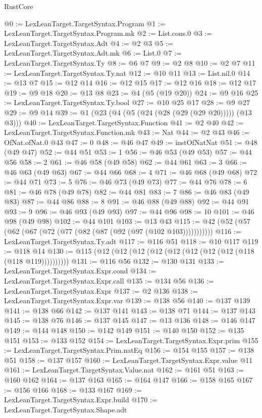 \begin{lexlean}{RustCore}
\begin{coremodule}
@0 := LexLeanTarget.TargetSyntax.Program
@1 := LexLeanTarget.TargetSyntax.Program.mk
@2 := List.cons.{0}
@3 := LexLeanTarget.TargetSyntax.Adt
@4 := @2 @3
@5 := LexLeanTarget.TargetSyntax.Adt.mk
@6 := List.{0}
@7 := LexLeanTarget.TargetSyntax.Ty
@8 := @6 @7
@9 := @2 @8
@10 := @2 @7
@11 := LexLeanTarget.TargetSyntax.Ty.nat
@12 := @10 @11
@13 := List.nil.{0}
@14 := @13 @7
@15 := @12 @14
@16 := @12 @15
@17 := @12 @16
@18 := @12 @17
@19 := @9 @18
@20 := @13 @8
@23 := @4 (@5 (@19 @20))
@24 := @9 @16
@25 := LexLeanTarget.TargetSyntax.Ty.bool
@27 := @10 @25 @17
@28 := @9 @27
@29 := @9 @14
@39 := @1 (@23 (@4 (@5 (@24 (@28 (@29 (@29 @20))))) (@13 @3)))
@40 := LexLeanTarget.TargetSyntax.Function
@41 := @2 @40
@42 := LexLeanTarget.TargetSyntax.Function.mk
@43 := Nat
@44 := @2 @43
@46 := OfNat.ofNat.{0} @43
@47 := 0
@48 := @46 @47
@49 := instOfNatNat
@51 := @48 (@49 @47)
@52 := @44 @51
@53 := 1
@56 := @46 @53 (@49 @53)
@57 := @44 @56
@58 := 2
@61 := @46 @58 (@49 @58)
@62 := @44 @61
@63 := 3
@66 := @46 @63 (@49 @63)
@67 := @44 @66
@68 := 4
@71 := @46 @68 (@49 @68)
@72 := @44 @71
@73 := 5
@76 := @46 @73 (@49 @73)
@77 := @44 @76
@78 := 6
@81 := @46 @78 (@49 @78)
@82 := @44 @81
@83 := 7
@86 := @46 @83 (@49 @83)
@87 := @44 @86
@88 := 8
@91 := @46 @88 (@49 @88)
@92 := @44 @91
@93 := 9
@96 := @46 @93 (@49 @93)
@97 := @44 @96
@98 := 10
@101 := @46 @98 (@49 @98)
@102 := @44 @101
@103 := @13 @43
@115 := @42 (@52 (@57 (@62 (@67 (@72 (@77 (@82 (@87 (@92 (@97 (@102 @103)))))))))))
@116 := LexLeanTarget.TargetSyntax.Ty.adt
@117 := @116 @51
@118 := @10 @117
@119 := @118 @14
@130 := @115 (@12 (@12 (@12 (@12 (@12 (@12 (@12 (@12 (@118 (@118 @119))))))))))
@131 := @116 @56
@132 := @130 @131
@133 := LexLeanTarget.TargetSyntax.Expr.cond
@134 := LexLeanTarget.TargetSyntax.Expr.call
@135 := @134 @56
@136 := LexLeanTarget.TargetSyntax.Expr
@137 := @2 @136
@138 := LexLeanTarget.TargetSyntax.Expr.var
@139 := @138 @56
@140 := @137 @139
@141 := @138 @66
@142 := @137 @141
@143 := @138 @71
@144 := @137 @143
@145 := @138 @76
@146 := @137 @145
@147 := @13 @136
@148 := @146 @147
@149 := @144 @148
@150 := @142 @149
@151 := @140 @150
@152 := @135 @151
@153 := @133 @152
@154 := LexLeanTarget.TargetSyntax.Expr.prim
@155 := LexLeanTarget.TargetSyntax.Prim.natEq
@156 := @154 @155
@157 := @138 @51
@158 := @137 @157
@160 := LexLeanTarget.TargetSyntax.Expr.value @11
@161 := LexLeanTarget.TargetSyntax.Value.nat
@162 := @161 @51
@163 := @160 @162
@164 := @137 @163
@165 := @164 @147
@166 := @158 @165
@167 := @156 @166
@168 := @133 @167
@169 := LexLeanTarget.TargetSyntax.Expr.build
@170 := LexLeanTarget.TargetSyntax.Shape.adt

\end{coremodule}
\end{lexlean}
